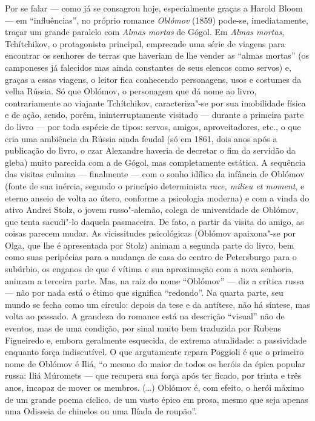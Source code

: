 Por se falar --- como já se consagrou hoje, especialmente graças a Harold Bloom --- em ``influências'', no próprio romance \emph{Oblómov} (1859) pode-se, imediatamente, traçar um grande paralelo com \emph{Almas mortas} de Gógol. Em \emph{Almas mortas}, Tchítchikov, o protagonista principal, empreende uma série de viagens para encontrar os senhores de terras que haveriam de lhe vender as ``almas mortas'' (os camponeses já falecidos mas ainda constantes de seus elencos como servos) e, graças a essas viagens, o leitor fica conhecendo personagens, usos e costumes da velha Rússia. Só que Oblómov, o personagem que dá nome ao livro, contrariamente ao viajante Tchítchikov, caracteriza"-se por sua imobilidade física e de ação, sendo, porém, ininterruptamente visitado --- durante a primeira parte do livro --- por toda espécie de tipos: servos, amigos, aproveitadores, etc., o que cria uma ambiência da Rússia ainda feudal (só em 1861, dois anos após a publicação do livro, o czar Alexandre  haveria de decretar o fim da servidão da gleba) muito parecida com a de Gógol, mas completamente estática. A sequência das visitas culmina --- finalmente --- com o sonho idílico da infância de Oblómov (fonte de sua inércia, segundo o princípio determinista \emph{race, milieu et moment}, e eterno anseio de volta ao útero, conforme a psicologia moderna) e com a vinda do ativo Andrei Stolz, o jovem russo"-alemão, colega de universidade de Oblómov, que tenta sacudi"-lo daquela pasmaceira. De fato, a partir da visita do amigo, as coisas parecem mudar. As vicissitudes psicológicas (Oblómov apaixona"-se por Olga, que lhe é apresentada por Stolz) animam a segunda parte do livro, bem como suas peripécias para a mudança de casa do centro de Petersburgo para o subúrbio, os enganos de que é vítima e sua aproximação com a nova senhoria, animam a terceira parte. Mas, na raiz do nome ``Oblómov'' --- diz a crítica russa --- não por nada está o étimo que significa ``redondo''. Na quarta parte, seu mundo se fecha como um círculo: depois da tese e da antítese, não há síntese, mas volta ao passado. A grandeza do romance está na descrição ``visual'' não de eventos, mas de uma condição, por sinal muito bem traduzida por Rubens Figueiredo e, embora geralmente esquecida, de extrema atualidade: a passividade enquanto força indiscutível. O que argutamente repara Poggioli é que o primeiro nome de Oblómov é Iliá, ``o mesmo do maior de todos os heróis da épica popular russa: Iliá Múromets --- que recupera sua força após ter ficado, por trinta e três anos, incapaz de mover os membros. (\ldots{}) Oblómov é, com efeito, o herói máximo de um grande poema cíclico, de um vasto épico em prosa, mesmo que seja apenas uma Odisseia de chinelos ou uma Ilíada de roupão''.

